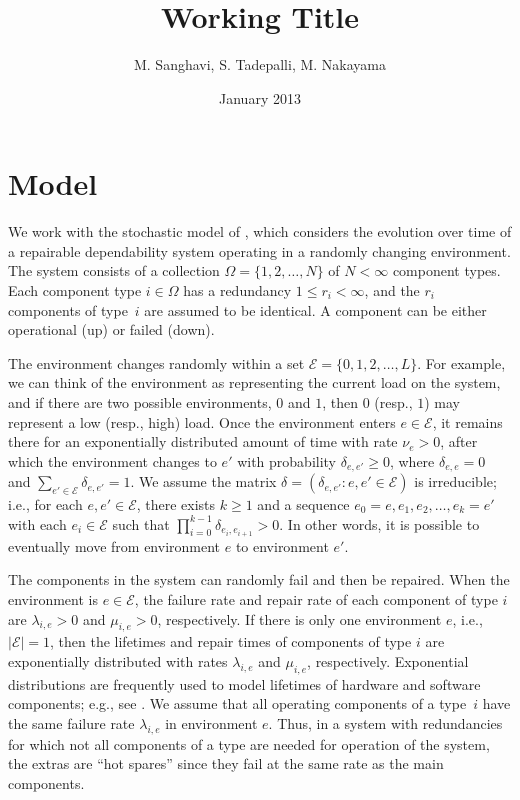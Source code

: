\documentclass[12pt]{article}
\author{M. Sanghavi, S. Tadepalli, M. Nakayama}
\date{January 2013}
\begin{document}
\title{Working Title}
\maketitle

\section{Model}
\label{sec:model}

We work with the stochastic model of \cite{ING:2009}, which considers the evolution over time of a repairable dependability system operating in a randomly changing environment. The system consists of a collection $\Omega = \{ 1, 2, \ldots, N \}$ of $N < \infty$ component types. Each component type $i \in \Omega$ has a redundancy $1 \leq r_i < \infty$, and the $r_i$ components of type~$i$ are assumed to be identical. A component can be either operational (up) or failed (down).

The environment changes randomly within a set $\mathcal{E} = \{ 0, 1, 2, \ldots, L \}$. For example, we can think of the environment as representing the current load on the system, and if there are two possible environments, $0$ and $1$, then $0$ (resp., $1$) may represent a low (resp., high) load. Once the environment enters $e \in \mathcal{E}$, it remains there for an exponentially distributed amount of time with rate $\nu_e > 0$, after which the environment changes to $e'$ with probability $\delta_{e, e'} \geq 0$, where $\delta_{e, e} = 0$ and $\sum_{e' \in \mathcal{E}} \delta_{e, e'} = 1$. We assume the matrix $\delta = (\delta_{e, e'} : e, e' \in \mathcal{E})$ is irreducible; i.e., for each $e, e' \in \mathcal{E}$, there exists $k \geq 1$ and a sequence $e_0 = e, e_1, e_2, \ldots, e_k = e'$ with each $e_i \in \mathcal{E}$ such that $\prod_{i = 0}^{k-1} \delta_{e_i, e_{i + 1}} > 0$. In other words, it is possible to eventually move from environment $e$ to environment $e'$.

The components in the system can randomly fail and then be repaired. When the environment is $e \in \mathcal{E}$, the failure rate and repair rate of each component of type $i$ are $\lambda_{i, e} > 0$ and $\mu_{i, e} > 0$, respectively.  If there is only one environment $e$, i.e., $| \mathcal{E} | = 1$, then the lifetimes and repair times of components of type $i$ are exponentially distributed with rates $\lambda_{i, e}$ and $\mu_{i, e}$, respectively. Exponential distributions are frequently used to model lifetimes of hardware and software components; e.g., see \cite{XDP:2004}. We assume that all operating components of a type~$i$ have the same failure rate $\lambda_{i, e}$ in environment $e$. Thus, in a system with  redundancies for which not all components of a type are needed for operation of the system, the extras are ``hot spares'' since they fail at the same rate as the main components.
\end{document}
